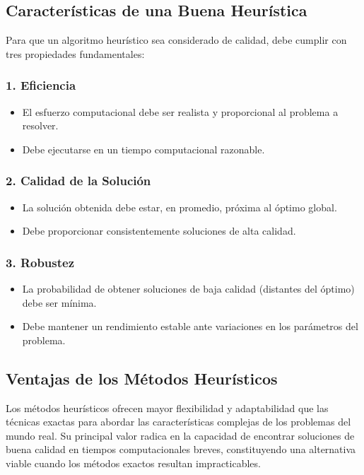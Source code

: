 \documentclass[12pt,titlepage,twoside,openright]{book}
\begin{document}
\subsection*{Características de una Buena Heurística}

Para que un algoritmo heurístico sea considerado de calidad, debe cumplir con tres propiedades fundamentales:

\subsubsection*{1. Eficiencia}
\begin{itemize}
    \item El esfuerzo computacional debe ser realista y proporcional al problema a resolver.
    \item Debe ejecutarse en un tiempo computacional razonable.
\end{itemize}

\subsubsection*{2. Calidad de la Solución}
\begin{itemize}
    \item La solución obtenida debe estar, en promedio, próxima al óptimo global.
    \item Debe proporcionar consistentemente soluciones de alta calidad.
\end{itemize}

\subsubsection*{3. Robustez}
\begin{itemize}
    \item La probabilidad de obtener soluciones de baja calidad (distantes del óptimo) debe ser mínima.
    \item Debe mantener un rendimiento estable ante variaciones en los parámetros del problema.
\end{itemize}

\subsection*{Ventajas de los Métodos Heurísticos}

Los métodos heurísticos ofrecen mayor flexibilidad y adaptabilidad que las técnicas exactas para abordar las características complejas de los problemas del mundo real. Su principal valor radica en la capacidad de encontrar soluciones de buena calidad en tiempos computacionales breves, constituyendo una alternativa viable cuando los métodos exactos resultan impracticables.
\end{document}
